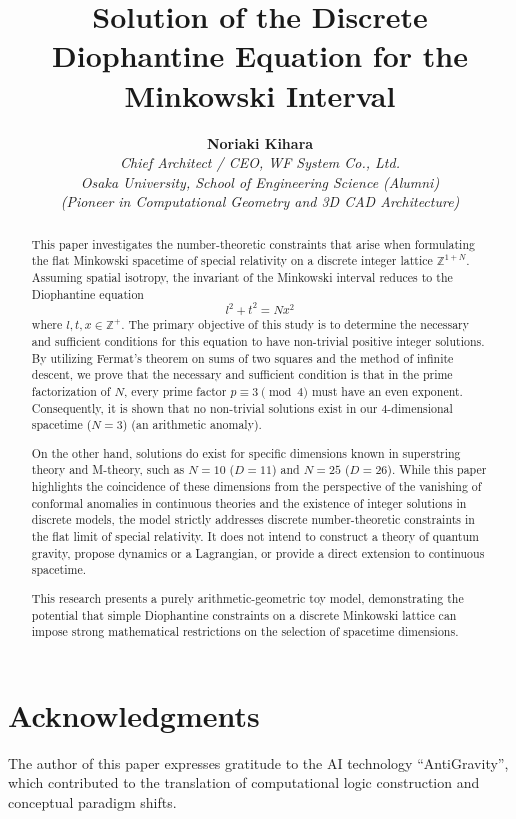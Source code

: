 \documentclass[11pt,a4paper]{article}
\title{\textbf{Solution of the Discrete Diophantine Equation for the Minkowski Interval}}
\author{\textbf{Noriaki Kihara} \\
\small\textit{Chief Architect / CEO, WF System Co., Ltd.} \\
\small\textit{Osaka University, School of Engineering Science (Alumni)} \\
\small\textit{(Pioneer in Computational Geometry and 3D CAD Architecture)}
}
\date{}
\begin{document}
\maketitle

\section*{Acknowledgments}
The author of this paper expresses gratitude to the AI technology ``AntiGravity'', which contributed to the translation of computational logic construction and conceptual paradigm shifts.

\begin{abstract}
This paper investigates the number-theoretic constraints that arise when formulating the flat Minkowski spacetime of special relativity on a discrete integer lattice $ \mathbb{Z}^{1+N} $. Assuming spatial isotropy, the invariant of the Minkowski interval reduces to the Diophantine equation
\[ l^2 + t^2 = N x^2 \]
where $ l, t, x \in \mathbb{Z}^+ $. The primary objective of this study is to determine the necessary and sufficient conditions for this equation to have non-trivial positive integer solutions. By utilizing Fermat's theorem on sums of two squares and the method of infinite descent, we prove that the necessary and sufficient condition is that in the prime factorization of $ N $, every prime factor $ p \equiv 3 \pmod{4} $ must have an even exponent. Consequently, it is shown that no non-trivial solutions exist in our 4-dimensional spacetime ($ N=3 $) (an arithmetic anomaly).

On the other hand, solutions do exist for specific dimensions known in superstring theory and M-theory, such as $ N=10 $ ($ D=11 $) and $ N=25 $ ($ D=26 $). While this paper highlights the coincidence of these dimensions from the perspective of the vanishing of conformal anomalies in continuous theories and the existence of integer solutions in discrete models, the model strictly addresses discrete number-theoretic constraints in the flat limit of special relativity. It does not intend to construct a theory of quantum gravity, propose dynamics or a Lagrangian, or provide a direct extension to continuous spacetime.

This research presents a purely arithmetic-geometric toy model, demonstrating the potential that simple Diophantine constraints on a discrete Minkowski lattice can impose strong mathematical restrictions on the selection of spacetime dimensions.
\end{abstract}
\end{document}
